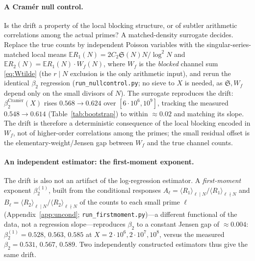 \documentclass[]{interact}%
\newcommand{\sing}{\mathfrak S}
\begin{document}
\paragraph{A Cram\'er null control.}
Is the drift a property of the local blocking structure, or of subtler arithmetic correlations
among the actual primes? A matched-density surrogate decides. Replace the true counts by
independent Poisson variables with the singular-series-matched local means
$\mathbb E R_1(N)=2C_2\sing(N)N/\log^2N$ and $\mathbb E R_2(N)=\mathbb E R_1(N)\cdot W_f(N)$, where
$W_f$ is the \emph{blocked} channel sum \eqref{eq:Wtilde} (the $r\mid N$ exclusion is the only
arithmetic input), and rerun the identical $\beta_2$ regression
(\texttt{run\_nullcontrol.py}; no sieve to $X$ is needed, as $\sing,W_f$ depend only on the small
divisors of $N$). The surrogate reproduces the drift: $\beta_2^{\mathrm{Cram\acute er}}(X)$ rises
$0.568\to0.624$ over $[6\cdot10^{6},10^{9}]$, tracking the measured $0.548\to0.614$
(Table~\ref{tab:bootstrap}) to within $\approx0.02$ and matching its slope. The drift is therefore
a deterministic consequence of the local blocking encoded in $W_f$, not of higher-order
correlations among the primes; the small residual offset is the elementary-weight/Jensen gap
between $W_f$ and the true channel counts.

\paragraph{An independent estimator: the first-moment exponent.}
The drift is also not an artifact of the log-regression estimator. A \emph{first-moment} exponent
$\beta_2^{(1)}$, built from the conditional responses
$A_\ell=\langle R_1\rangle_{\ell\mid N}/\langle R_1\rangle_{\ell\nmid N}$ and
$B_\ell=\langle R_2\rangle_{\ell\mid N}/\langle R_2\rangle_{\ell\nmid N}$ of the counts to each
small prime $\ell$ (Appendix~\ref{app:uncond}; \texttt{run\_firstmoment.py})---a different
functional of the data, not a regression slope---reproduces $\beta_2$ to a constant Jensen gap of
$\approx0.004$: $\beta_2^{(1)}=0.528,\,0.563,\,0.585$ at $X=2\cdot10^{6},2\cdot10^{7},10^{8}$,
versus the measured $\beta_2=0.531,\,0.567,\,0.589$. Two independently constructed estimators thus
give the same drift.
\end{document}
